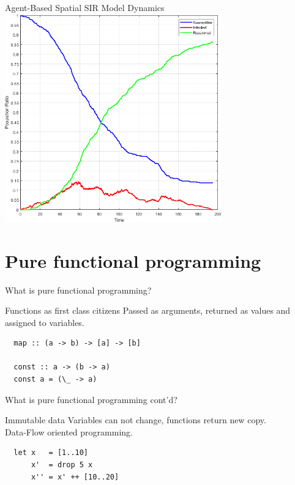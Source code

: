\documentclass{beamer} %
\begin{document}
\begin{frame}{Agent-Based Spatial SIR Model Dynamics}
  \center
  \includegraphics[width=0.7\textwidth]{./fig/SIR_Dunai_dt001.png}
\end{frame}

\section{Pure functional programming}
\begin{frame}[fragile]{What is pure functional programming?}
  \begin{block}{Functions as first class citizens}
  	Passed as arguments, returned as values and assigned to variables.
  \end{block}
  
  \begin{block}{}
  \begin{verbatim}
  map :: (a -> b) -> [a] -> [b]
	
  const :: a -> (b -> a)
  const a = (\_ -> a)
  \end{verbatim}
  \end{block}
\end{frame}
 
\begin{frame}[fragile]{What is pure functional programming cont'd?}
  \begin{block}{Immutable data}
 	Variables can not change, functions return new copy. \\ Data-Flow oriented programming.
  \end{block}
  
  \begin{block}{}
  \begin{verbatim}
  let x   = [1..10]
      x'  = drop 5 x
      x'' = x' ++ [10..20] 
  \end{verbatim}
  \end{block}
\end{frame}
 
\end{document}
